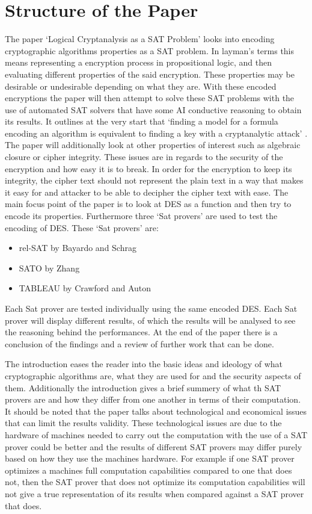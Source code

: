 \documentclass[11pt,a4paper, notitlepage]{report}
\begin{document}
\section{Structure of the Paper}
\label{sec:StrucPaper}

The paper `Logical Cryptanalysis as a SAT Problem' \cite{Fabio2000LogicalSAT} looks into encoding cryptographic algorithms properties as a SAT problem. In layman's terms this means representing a encryption process in propositional logic, and then evaluating different properties of the said encryption. These properties may be desirable or undesirable depending on what they are. With these encoded encryptions the paper will then attempt to solve these SAT problems with the use of automated SAT solvers that have some AI conductive reasoning to obtain its results. It outlines at the very start that `finding a model for a formula encoding an algorithm is equivalent to finding a key with a cryptanalytic attack' \cite{Fabio2000LogicalSAT}. The paper will additionally look at other properties of interest such as algebraic closure or cipher integrity. These issues are in regards to the security of the encryption and how easy it is to break. In order for the encryption to keep its integrity, the cipher text should not represent the plain text in a way that makes it easy for and attacker to be able to decipher the cipher text with ease. The main focus point of the paper is to look at DES as a function and then try to encode its properties. Furthermore three `Sat provers' are used to test the encoding of DES. These `Sat provers' are:

\begin{itemize}
  \item rel-SAT by Bayardo and Schrag
  \item SATO by Zhang
  \item TABLEAU by Crawford and Auton
\end{itemize}
Each Sat prover are tested individually using the same encoded DES. Each Sat prover will display different results, of which the results will be analysed to see the reasoning behind the performances. At the end of the paper there is a conclusion of the findings and a review of further work that can be done. 

The introduction eases the reader into the basic ideas and ideology of what cryptographic algorithms are, what they are used for and the security aspects of them. Additionally the introduction gives a brief summery of what th SAT provers are and how they differ from one another in terms of their computation. It should be noted that the paper talks about technological and economical issues that can limit the results validity. These technological issues are due to the hardware of machines needed to carry out the computation with the use of a SAT prover could be better and the results of different SAT provers may differ purely based on how they use the machines hardware. For example if one SAT prover optimizes a machines full computation capabilities compared to one that does not, then the SAT prover that does not optimize its computation capabilities will not give a true representation of its results when compared against a SAT prover that does. 
\end{document}
